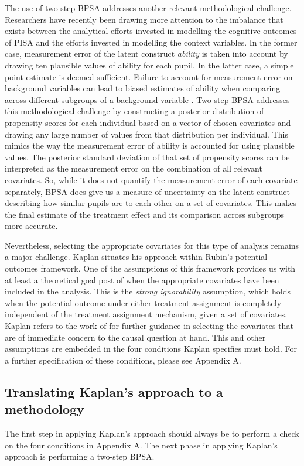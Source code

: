 \documentclass{article}
\begin{document}
The use of two-step BPSA addresses another relevant methodological challenge. Researchers have recently been drawing more attention to the imbalance that exists between the analytical efforts invested in modelling the cognitive outcomes of PISA and the efforts invested in modelling the context variables. In the former case, measurement error of the latent construct \emph{ability} is taken into account by drawing ten plausible values of ability for each pupil. In the latter case, a simple point estimate is deemed sufficient. Failure to account for measurement error on background variables can lead to biased estimates of ability when comparing across different subgroups of a background variable \parencite{rutkowski2016call,frey2020methodological}. Two-step BPSA addresses this methodological challenge by constructing a posterior distribution of propensity scores for each individual based on a vector of chosen covariates and drawing any large number of values from that distribution per individual. This mimics the way the measurement error of ability is accounted for using plausible values. The posterior standard deviation of that set of propensity scores can be interpreted as the measurement error on the combination of all relevant covariates. So, while it does not quantify the measurement error of each covariate separately, BPSA does give us a measure of uncertainty on the latent construct describing how similar pupils are to each other on a set of covariates. This makes the final estimate of the treatment effect and its comparison across subgroups more accurate.

Nevertheless, selecting the appropriate covariates for this type of analysis remains a major challenge. Kaplan situates his approach within Rubin's potential outcomes framework. One of the assumptions of this framework provides us with at least a theoretical goal post of when the appropriate covariates have been included in the analysis. This is the \emph{strong ignorability} assumption, which holds when the potential outcome under either treatment assignment is completely independent of the treatment assignment mechanism, given a set of covariates. Kaplan refers to the work of \textcite{mackie_cement_1974} for further guidance in selecting the covariates that are of immediate concern to the causal question at hand. This and other assumptions are embedded in the four conditions Kaplan specifies must hold. For a further specification of these conditions, please see Appendix A. 

\subsection{Translating Kaplan's approach to a methodology}
The first step in applying Kaplan's approach should always be to perform a check on the four conditions in Appendix A. The next phase in applying Kaplan's approach is performing a two-step BPSA. \newline
\end{document}
